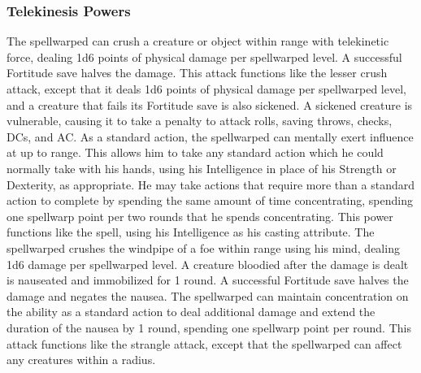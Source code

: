 \subsubsection{Telekinesis Powers}
 The spellwarped can crush a creature or object within \rngclose range with telekinetic force, dealing 1d6 points of physical damage  per spellwarped level. A successful Fortitude save halves the damage.
 This attack functions like the lesser crush attack, except that it deals 1d6 points of physical damage per spellwarped level, and a creature that fails its Fortitude save is also sickened. A sickened creature is vulnerable, causing it to take a  penalty to attack rolls, saving throws, checks, DCs, and AC.
 As a standard action, the spellwarped can mentally exert influence at up to \rngclose range. This allows him to take any standard action which he could normally take with his hands, using his Intelligence in place of his Strength or Dexterity, as appropriate. He may take actions that require more than a standard action to complete by spending the same amount of time concentrating, spending one spellwarp point per two rounds that he spends concentrating.
 This power functions like the  spell, using his Intelligence as his casting attribute.
 The spellwarped crushes the windpipe of a foe within \rngclose range using his mind, dealing 1d6 damage per spellwarped level. A creature bloodied after the damage is dealt is nauseated and immobilized for 1 round. A successful Fortitude save halves the damage and negates the nausea. The spellwarped can maintain concentration on the ability as a standard action to deal additional damage and extend the duration of the nausea by 1 round, spending one spellwarp point per round.
 This attack functions like the strangle attack, except that the spellwarped can affect any creatures within a \areasmall radius.

